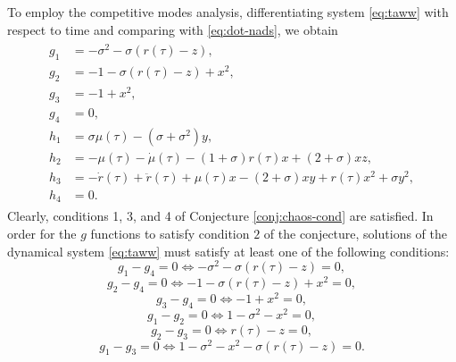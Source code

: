 To employ the competitive modes analysis, differentiating system \eqref{eq:taww} with respect to time and comparing with 
\eqref{eq:dot-nads}, we obtain
\begin{align}
\begin{split}
g_1 &= -\sigma^2 - \sigma (r(\tau)  - z), \\
g_2 &= -1 -\sigma (r(\tau)-z)  +x^2, \\
g_3 &= -1 +x^2, \\
g_4 &= 0, \\
h_1 &= \sigma \mu(\tau) -(\sigma +\sigma^2)y, \\
h_2 &= -\mu(\tau) -\dot{\mu}(\tau) -(1+\sigma)r(\tau)x +(2+\sigma)xz, \\
h_3 &= -\dot{r}(\tau) +\ddot{r}(\tau) +\mu(\tau)x -(2 +\sigma)xy +r(\tau)x^2 +\sigma y^2, \\
h_4 &= 0.
\end{split}
\end{align}
Clearly, conditions 1, 3, and 4 of Conjecture \ref{conj:chaos-cond} are satisfied. In 
order for the $g$ functions to satisfy condition $2$ of the conjecture, solutions of 
the dynamical system \eqref{eq:taww} must satisfy at least one of the following conditions:
\begin{equation} \label{eq:mfs1}
g_1 - g_4 = 0 \iff -\sigma^2 - \sigma (r(\tau)  - z)=0, 
\end{equation}
\begin{equation} \label{eq:mfs2}
g_2 - g_4 = 0 \iff -1 -\sigma (r(\tau)-z)  +x^2=0,
\end{equation}
\begin{equation} \label{eq:mfs3}
g_3 - g_4 = 0 \iff -1 +x^2=0,
\end{equation}
\begin{equation} \label{eq:mfs4}
g_1 - g_2 =0 \iff 1 - \sigma^2 -x^2 =0,
\end{equation}
\begin{equation} \label{eq:mfs5}
g_2 - g_3 =0 \iff r(\tau) -z=0,
\end{equation}
\begin{equation} \label{eq:mfs6}
g_1 - g_3 =0 \iff 1 - \sigma^2 -x^2 -\sigma(r(\tau) -z)=0.
\end{equation}



